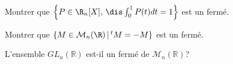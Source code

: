 \documentclass[a4paper,10pt]{report}
\begin{document}

\begin{Exa} Montrer que $\left\{P\in\R_n[X], \, \dis\int_0^1P(t)dt= 1\right\}$ est un fermé.
\end{Exa}


\begin{Exa} Montrer que $\{M\in{\cal M}_n(\R) \, \vert \,  ^tM=-M\}$ est un fermé.
\end{Exa}


\begin{Exa} L'ensemble $GL_n(\mathbb{R})$ est-il un fermé de $\mathcal{M}_n(\mathbb{R})$?
\end{Exa} 

\end{document}

